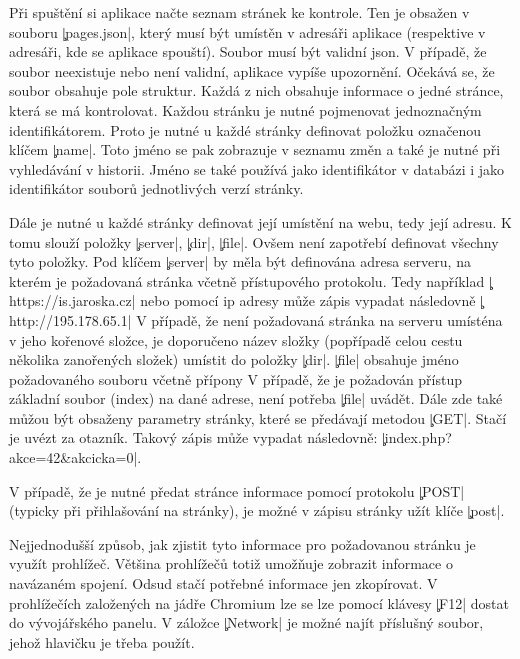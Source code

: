 
Při spuštění si aplikace načte seznam stránek ke kontrole.
Ten je obsažen v souboru \c|pages.json|, který musí být umístěn v adresáři aplikace (respektive v adresáři, kde se aplikace spouští).
Soubor musí být validní json.
V případě, že soubor neexistuje nebo není validní, aplikace vypíše upozornění. %
Očekává se, že soubor obsahuje pole struktur.
Každá z nich obsahuje informace o jedné stránce, která se má kontrolovat.
Každou stránku je nutné pojmenovat jednoznačným identifikátorem.
Proto je nutné u každé stránky definovat položku označenou klíčem \c|name|.
Toto jméno se pak zobrazuje v seznamu změn a také je nutné při vyhledávání v historii.
Jméno se také používá jako identifikátor v databázi i jako identifikátor souborů jednotlivých verzí stránky.

Dále je nutné u každé stránky definovat její umístění na webu, tedy její adresu.
K tomu slouží položky \c|server|, \c|dir|, \c|file|.
Ovšem není zapotřebí definovat všechny tyto položky.
Pod klíčem \c|server| by měla být definována adresa serveru, na kterém je požadovaná stránka včetně přístupového protokolu.
Tedy například \c|https://is.jaroska.cz| nebo pomocí ip adresy může zápis vypadat následovně \c|http://195.178.65.1|
V případě, že není požadovaná stránka na serveru umísténa v jeho kořenové složce, je doporučeno název složky (popřípadě celou cestu několika zanořených složek) umístit do položky \c|dir|.
\c|file| obsahuje jméno požadovaného souboru včetně přípony
V případě, že je požadován přístup základní soubor (index) na dané adrese, není potřeba \c|file| uvádět.
Dále zde také můžou být obsaženy parametry stránky, které se předávají metodou \c|GET|.
Stačí je uvézt za otazník.
Takový zápis může vypadat následovně: \c|index.php?akce=42&akcicka=0|.

V případě, že je nutné předat stránce informace pomocí protokolu \c|POST| (typicky při přihlašování na stránky), 
je možné v zápisu stránky užít klíče \c|post|.

Nejjednodušší způsob, jak zjistit tyto informace pro požadovanou stránku je využít prohlížeč.
Většina prohlížečů totiž umožňuje zobrazit informace o navázaném spojení.
Odsud stačí potřebné informace jen zkopírovat.
V prohlížečích založených na jádře Chromium lze se lze pomocí klávesy \c|F12| dostat do vývojářského panelu.
V záložce \c|Network| je možné najít příslušný soubor, jehož hlavičku je třeba použít.


